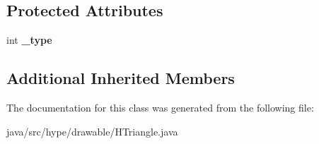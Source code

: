 \subsection*{Protected Attributes}
\begin{DoxyCompactItemize}
\item 
\hypertarget{classhype_1_1drawable_1_1_h_triangle_a39c67a955d8228ff3bd6d165ad25eebb}{int {\bfseries \-\_\-type}}\label{classhype_1_1drawable_1_1_h_triangle_a39c67a955d8228ff3bd6d165ad25eebb}

\end{DoxyCompactItemize}
\subsection*{Additional Inherited Members}


The documentation for this class was generated from the following file\-:\begin{DoxyCompactItemize}
\item 
java/src/hype/drawable/H\-Triangle.\-java\end{DoxyCompactItemize}
